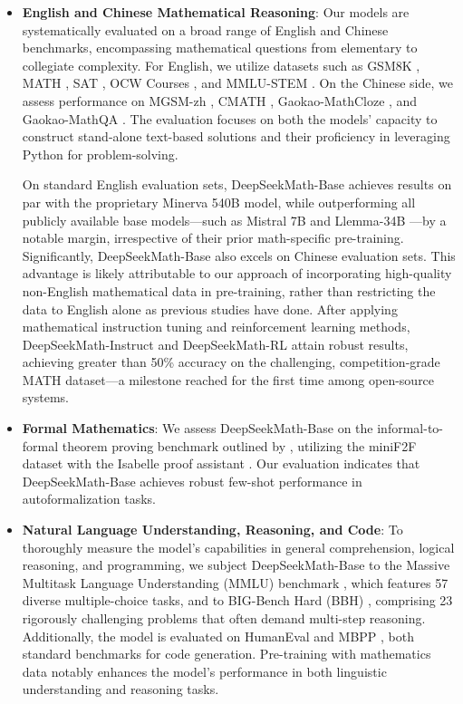 \begin{itemize}[topsep=0pt]
    \item \textbf{English and Chinese Mathematical Reasoning}: Our models are systematically evaluated on a broad range of English and Chinese benchmarks, encompassing mathematical questions from elementary to collegiate complexity. For English, we utilize datasets such as GSM8K \citep{gsm8k}, MATH \citep{MATH}, SAT \citep{llemma}, OCW Courses \citep{minerva}, and MMLU-STEM \citep{mmlu}. On the Chinese side, we assess performance on MGSM-zh \citep{mgsm}, CMATH \citep{wei2023cmath}, Gaokao-MathCloze \citep{agieval}, and Gaokao-MathQA \citep{agieval}. The evaluation focuses on both the models' capacity to construct stand-alone text-based solutions and their proficiency in leveraging Python for problem-solving.

On standard English evaluation sets, DeepSeekMath-Base achieves results on par with the proprietary Minerva 540B \citep{minerva} model, while outperforming all publicly available base models—such as Mistral 7B \citep{mistral} and Llemma-34B \citep{llemma}—by a notable margin, irrespective of their prior math-specific pre-training. Significantly, DeepSeekMath-Base also excels on Chinese evaluation sets. This advantage is likely attributable to our approach of incorporating high-quality non-English mathematical data in pre-training, rather than restricting the data to English alone as previous studies \citep{minerva,llemma} have done. After applying mathematical instruction tuning and reinforcement learning methods, DeepSeekMath-Instruct and DeepSeekMath-RL attain robust results, achieving greater than 50\% accuracy on the challenging, competition-grade MATH dataset—a milestone reached for the first time among open-source systems.

\item \textbf{Formal Mathematics}: We assess DeepSeekMath-Base on the informal-to-formal theorem proving benchmark outlined by \citep{dsp_proof}, utilizing the miniF2F dataset \citep{minif2f} with the Isabelle proof assistant \citep{isabelle}. Our evaluation indicates that DeepSeekMath-Base achieves robust few-shot performance in autoformalization tasks.
\item \textbf{Natural Language Understanding, Reasoning, and Code}: To thoroughly measure the model's capabilities in general comprehension, logical reasoning, and programming, we subject DeepSeekMath-Base to the Massive Multitask Language Understanding (MMLU) benchmark \citep{mmlu}, which features 57 diverse multiple-choice tasks, and to BIG-Bench Hard (BBH) \citep{bbh}, comprising 23 rigorously challenging problems that often demand multi-step reasoning. Additionally, the model is evaluated on HumanEval \citep{codex} and MBPP \citep{mbpp}, both standard benchmarks for code generation. Pre-training with mathematics data notably enhances the model’s performance in both linguistic understanding and reasoning tasks.


\end{itemize}
